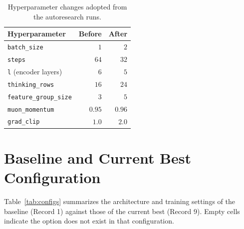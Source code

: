 \documentclass{article}
\theoremstyle{plain}
\theoremstyle{definition}
\theoremstyle{remark}
\begin{document}
\begin{table}[h]
\centering
\small
\caption{Hyperparameter changes adopted from the autoresearch runs.}
\label{tab:autoresearch-hpo}
\begin{tabular}{@{}lrr@{}}
  \toprule
  Hyperparameter & Before & After \\
  \midrule
  \texttt{batch\_size}         & $1$    & $2$    \\
  \texttt{steps}               & $64$   & $32$   \\
  \texttt{l} (encoder layers)  & $6$    & $5$    \\
  \texttt{thinking\_rows}      & $16$   & $24$   \\
  \texttt{feature\_group\_size}& $3$    & $5$    \\
  \texttt{muon\_momentum}      & $0.95$ & $0.96$ \\
  \texttt{grad\_clip}          & $1.0$  & $2.0$  \\
  \bottomrule
\end{tabular}
\end{table}

\section{Baseline and Current Best Configuration}
\label{app:configs}

Table~\ref{tab:configs} summarizes the architecture and training settings of the baseline (Record 1) against those of the current best (Record 9).
Empty cells indicate the option does not exist in that configuration.
\end{document}
